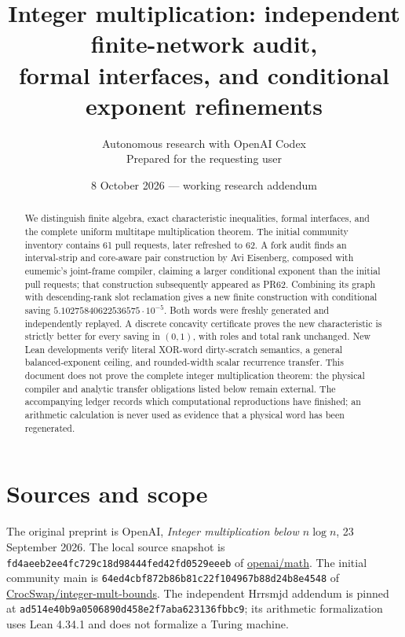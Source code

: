 \documentclass[11pt]{article}
\title{Integer multiplication: independent finite-network audit,\protect\\
formal interfaces, and conditional exponent refinements}
\author{Autonomous research with OpenAI Codex\\Prepared for the requesting user}
\date{8 October 2026 --- working research addendum}
\begin{document}
\maketitle
\begin{abstract}
We distinguish finite algebra, exact characteristic inequalities, formal
interfaces, and the complete uniform multitape multiplication theorem.
The initial community inventory contains 61 pull requests, later refreshed to 62. A fork audit finds
an interval-strip and core-aware pair construction by Avi Eisenberg, composed
with eumemic's joint-frame compiler, claiming a larger conditional exponent
than the initial pull requests; that construction subsequently appeared as PR62.
Combining its graph with descending-rank slot reclamation gives a new finite
construction with conditional saving $5.10275840622536575\cdot10^{-5}$.
Both words were freshly generated and independently replayed. A discrete
concavity certificate proves the new characteristic is strictly better for
every saving in $(0,1)$, with roles and total rank unchanged.
New Lean developments verify literal XOR-word dirty-scratch semantics,
a general balanced-exponent ceiling, and rounded-width scalar recurrence transfer. This document
does not prove the complete integer multiplication theorem: the physical
compiler and analytic transfer obligations listed below remain external.
The accompanying ledger records which computational reproductions have
finished; an arithmetic calculation is never used as evidence that a physical
word has been regenerated.
\end{abstract}

\section{Sources and scope}
The original preprint is OpenAI, \emph{Integer multiplication below
$n\log n$}, 23 September 2026. The local source snapshot is
\texttt{fd4aeeb2ee4fc729c18d98444fed42fd0529eeeb} of
\href{https://github.com/openai/math}{openai/math}.
The initial community main is
\texttt{64ed4cbf872b86b81c22f104967b88d24b8e4548} of
\href{https://github.com/CrocSwap/integer-mult-bounds}{CrocSwap/integer-mult-bounds}.
The independent Hrrsmjd addendum is pinned at
\texttt{ad514e40b9a0506890d458e2f7aba623136fbbc9}; its arithmetic
formalization uses Lean 4.34.1 and does not formalize a Turing machine.
\end{document}
